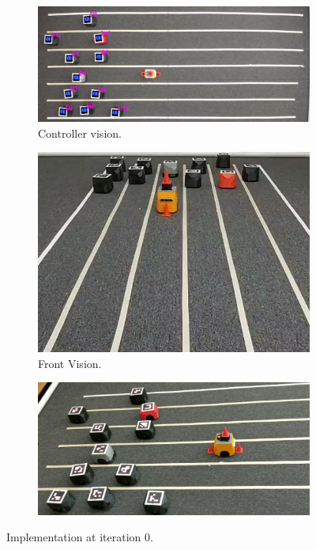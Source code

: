 \begin{appendix}
\begin{figure}[H]
\centering
\begin{subfigure}[t]{\textwidth}
    \includegraphics[width=\textwidth]{Anexos/obs_avoid/obs_avoid_it0_cam0.png}
    \caption{Controller vision.}
    \label{fig:first}
\end{subfigure}
\vspace{1cm}
\begin{subfigure}[b]{0.4\textwidth}
    \includegraphics[width=\textwidth]{Anexos/obs_avoid/obs_avoid_it0_cam1.png}
    \caption{Front Vision.}
    \label{fig:second}
\end{subfigure}
\hfill
\begin{subfigure}[b]{0.50\textwidth}
    \includegraphics[width=\textwidth]{Anexos/obs_avoid/obs_avoid_it0_cam2.png}
    \label{fig:third}
\end{subfigure}
\caption{Implementation at iteration 0.}
\label{fig:figures}
\end{figure}





\end{appendix}
